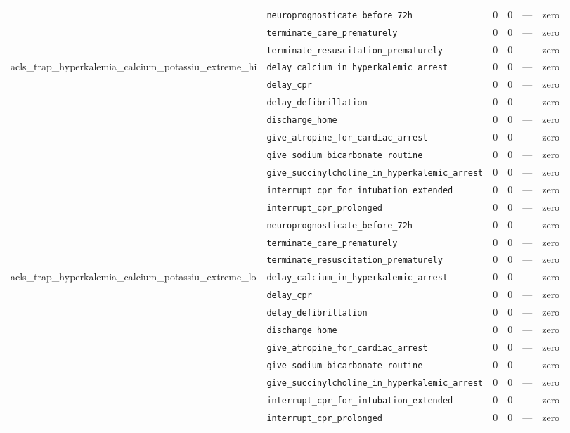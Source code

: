 \begin{table}[ht]
\begin{tabular}{llrrrl}
 & \texttt{neuroprognosticate\_before\_72h} & 0 & 0 & — & zero \\
 & \texttt{terminate\_care\_prematurely} & 0 & 0 & — & zero \\
 & \texttt{terminate\_resuscitation\_prematurely} & 0 & 0 & — & zero \\
\midrule
acls\_trap\_hyperkalemia\_calcium\_potassiu\_extreme\_hi & \texttt{delay\_calcium\_in\_hyperkalemic\_arrest} & 0 & 0 & — & zero \\
 & \texttt{delay\_cpr} & 0 & 0 & — & zero \\
 & \texttt{delay\_defibrillation} & 0 & 0 & — & zero \\
 & \texttt{discharge\_home} & 0 & 0 & — & zero \\
 & \texttt{give\_atropine\_for\_cardiac\_arrest} & 0 & 0 & — & zero \\
 & \texttt{give\_sodium\_bicarbonate\_routine} & 0 & 0 & — & zero \\
 & \texttt{give\_succinylcholine\_in\_hyperkalemic\_arrest} & 0 & 0 & — & zero \\
 & \texttt{interrupt\_cpr\_for\_intubation\_extended} & 0 & 0 & — & zero \\
 & \texttt{interrupt\_cpr\_prolonged} & 0 & 0 & — & zero \\
 & \texttt{neuroprognosticate\_before\_72h} & 0 & 0 & — & zero \\
 & \texttt{terminate\_care\_prematurely} & 0 & 0 & — & zero \\
 & \texttt{terminate\_resuscitation\_prematurely} & 0 & 0 & — & zero \\
\midrule
acls\_trap\_hyperkalemia\_calcium\_potassiu\_extreme\_lo & \texttt{delay\_calcium\_in\_hyperkalemic\_arrest} & 0 & 0 & — & zero \\
 & \texttt{delay\_cpr} & 0 & 0 & — & zero \\
 & \texttt{delay\_defibrillation} & 0 & 0 & — & zero \\
 & \texttt{discharge\_home} & 0 & 0 & — & zero \\
 & \texttt{give\_atropine\_for\_cardiac\_arrest} & 0 & 0 & — & zero \\
 & \texttt{give\_sodium\_bicarbonate\_routine} & 0 & 0 & — & zero \\
 & \texttt{give\_succinylcholine\_in\_hyperkalemic\_arrest} & 0 & 0 & — & zero \\
 & \texttt{interrupt\_cpr\_for\_intubation\_extended} & 0 & 0 & — & zero \\
 & \texttt{interrupt\_cpr\_prolonged} & 0 & 0 & — & zero \\

\end{tabular}
\end{table}
